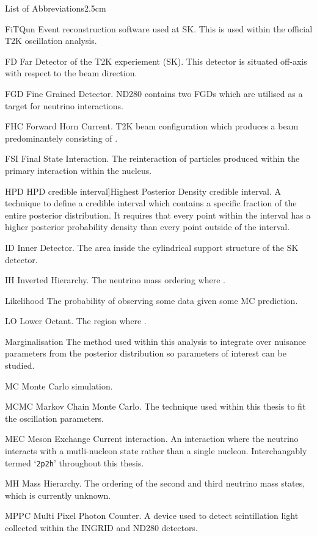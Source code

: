 \begin{mclistof}{List of Abbreviations}{2.5cm}
\item[FiTQun]Event reconstruction software used at SK. This is used within the official T2K oscillation analysis.
\item[FD]Far Detector of the T2K experiement (SK). This detector is situated \quickmath{2.5\deg} off-axis with respect to the beam direction.
\item[FGD]Fine Grained Detector. ND280 contains two FGDs which are utilised as a target for neutrino interactions.
\item[FHC]Forward Horn Current. T2K beam configuration which produces a beam predominantely consisting of \quickmath{\nu_\mu}.
\item[FSI]Final State Interaction. The reinteraction of particles produced within the primary interaction within the nucleus.
\item[HPD]HPD credible interval]Highest Posterior Density credible interval. A technique to define a credible interval which contains a specific fraction of the entire posterior distribution. It requires that every point within the interval has a higher posterior probability density than every point outside of the interval.
\item[ID]Inner Detector. The area inside the cylindrical support structure of the SK detector.
\item[IH]Inverted Hierarchy. The neutrino mass ordering where .
\item[Likelihood]The probability of observing some data given some MC prediction.
\item[LO]Lower Octant. The region where .
\item[Marginalisation]The method used within this analysis to integrate over nuisance parameters from the posterior distribution so parameters of interest can be studied.
\item[MC]Monte Carlo simulation.  
\item[MCMC]Markov Chain Monte Carlo. The technique used within this thesis to fit the oscillation parameters.
\item[MEC]Meson Exchange Current interaction. An interaction where the neutrino interacts with a mutli-nucleon state rather than a single nucleon. Interchangably termed `\texttt{2p2h}' throughout this thesis.
\item[MH]Mass Hierarchy. The ordering of the second and third neutrino mass states, which is currently unknown.
\item[MPPC]Multi Pixel Photon Counter. A device used to detect scintillation light collected within the INGRID and ND280 detectors.

\end{mclistof}
